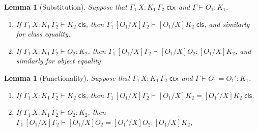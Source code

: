 \documentclass[11pt,twoside]{article}
\newtheorem{lemma}[theorem]{Lemma}
\newcommand{\subst}[3]{[{#1}/{#2}]{#3}}
\newcommand{\isctx}[2][]{{#2}\;\mathsf{ctx}_{#1}}
\newcommand{\iscls}[3][]{{#2}\vdash_{#1}{#3}\;\mathsf{cls}}
\newcommand{\eqcls}[4][]{{#2}\vdash_{#1}{#3}={#4}\;\mathsf{cls}}
\newcommand{\isobj}[4][]{{#2}\vdash_{#1}{#3}:{#4}}
\newcommand{\eqobj}[5][]{{#2}\vdash_{#1}{#3}={#4}:{#5}}
\begin{document}
\begin{lemma}[Substitution]
  \label{lemma:subst}
  Suppose that $\isctx{\Gamma_{1}\,X{:}K_{1}\,\Gamma_{2}}$ and $\isobj{\Gamma}{O_{1}}{K_{1}}$.
  \begin{enumerate}
  \item If\/ $\iscls{\Gamma_{1}\,X{:}K_{1}\,\Gamma_{2}}{K_{2}}$, then
    $\iscls{\Gamma_{1}\,\subst{O_{1}}{X}{\Gamma_{2}}}{\subst{O_{1}}{X}{K_{2}}}$, and similarly for class equality.
  \item If\/ $\isobj{\Gamma_{1}\,X{:}K_{1}\,\Gamma_{2}}{O_{2}}{K_{2}}$, then
    $\isobj{\Gamma_{1}\,\subst{O_{1}}{X}{\Gamma_{2}}}{\subst{O_{1}}{X}{O_{2}}}{\subst{O_{1}}{X}{K_{2}}}$,
    and similarly for object equality.
  \end{enumerate}
\end{lemma}

\begin{lemma}[Functionality]
  \label{lemma:func}
  Suppose that $\isctx{\Gamma_{1}\,X{:}K_{1}\,\Gamma_{2}}$ and $\eqobj{\Gamma}{O_{1}}{O_{1}'}{K_{1}}$.
  \begin{enumerate}
  \item If\/ $\iscls{\Gamma_{1}\,X{:}K_{1}\,\Gamma_{2}}{K_{2}}$, then
    $\eqcls{\Gamma_{1}\,\subst{O_{1}}{X}{\Gamma_{2}}}{\subst{O_{1}}{X}{K_{2}}}{\subst{O_{1}'}{X}{K_{2}}}$.
  \item If\/ $\isobj{\Gamma_{1}\,X{:}K_{1}\,\Gamma_{2}}{O_{2}}{K_{2}}$, then
    $\eqobj{\Gamma_{1}\,\subst{O_{1}}{X}{\Gamma_{2}}}{\subst{O_{1}}{X}{O_{2}}}{\subst{O_{1}'}{X}{O_{2}}}{\subst{O_{1}}{X}{K_{2}}}$,
  \end{enumerate}
\end{lemma}
\end{document}
